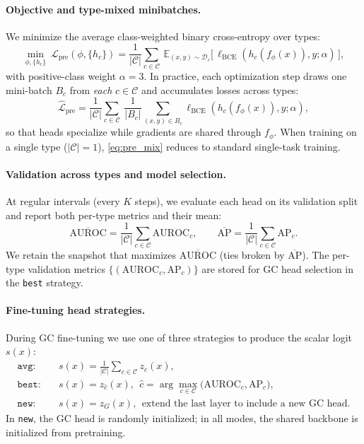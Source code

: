 \documentclass[journal,article,submit,pdftex,moreauthors]{Definitions/mdpi}
\begin{document}
\paragraph{Objective and type-mixed minibatches.}
We minimize the average class-weighted binary cross-entropy over types:
\begin{equation}
\label{eq:pre_obj}
\min_{\phi,\{h_c\}}\ \mathcal{L}_{\mathrm{pre}}(\phi,\{h_c\})=\frac{1}{|\mathcal{C}|}\sum_{c\in\mathcal{C}} \ \mathbb{E}_{(x,y)\sim\mathcal{D}_c}\!\big[\,\ell_{\mathrm{BCE}}(h_c(f_\phi(x)),y;\alpha)\,\big],
\end{equation}
with positive-class weight $\alpha{=}3$. In practice, each optimization step draws one mini-batch $B_c$ from \emph{each} $c\in\mathcal{C}$ and accumulates losses across types:
\begin{equation}
\label{eq:pre_mix}
\hat{\mathcal{L}}_{\mathrm{pre}}=\frac{1}{|\mathcal{C}|}\sum_{c\in\mathcal{C}}\ \frac{1}{|B_c|}\sum_{(x,y)\in B_c}\ell_{\mathrm{BCE}}(h_c(f_\phi(x)),y;\alpha),
\end{equation}
so that heads specialize while gradients are shared through $f_\phi$. When training on a single type ($|\mathcal{C}|{=}1$), \eqref{eq:pre_mix} reduces to standard single-task training.

\paragraph{Validation across types and model selection.}
At regular intervals (every $K$ steps), we evaluate each head on its validation split and report both per-type metrics and their mean:
\begin{equation}
\overline{\mathrm{AUROC}}=\frac{1}{|\mathcal{C}|}\sum_{c\in\mathcal{C}}\mathrm{AUROC}_c,\qquad
\overline{\mathrm{AP}}=\frac{1}{|\mathcal{C}|}\sum_{c\in\mathcal{C}}\mathrm{AP}_c.
\end{equation}
We retain the snapshot that maximizes $\overline{\mathrm{AUROC}}$ (ties broken by $\overline{\mathrm{AP}}$). The per-type validation metrics $\{(\mathrm{AUROC}_c,\mathrm{AP}_c)\}$ are stored for GC head selection in the \texttt{best} strategy.

\paragraph{Fine-tuning head strategies.}
During GC fine-tuning we use one of three strategies to produce the scalar logit $s(x)$:
\begin{align}
\texttt{avg:}\quad & s(x)=\frac{1}{|\mathcal{C}|}\sum_{c\in\mathcal{C}} z_c(x),\\
\texttt{best:}\quad & s(x)=z_{\hat c}(x),\ \ \hat c=\arg\max_{c\in\mathcal{C}}\big(\mathrm{AUROC}_c,\mathrm{AP}_c\big),\\
\texttt{new:}\quad & s(x)=z_G(x),\ \ \text{extend the last layer to include a new GC head.}
\end{align}
In \texttt{new}, the GC head is randomly initialized; in all modes, the shared backbone is initialized from pretraining.
\end{document}
